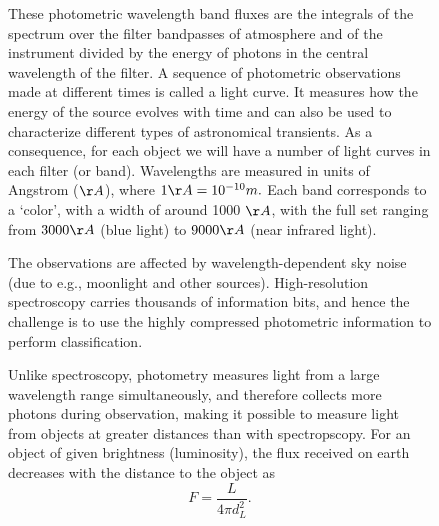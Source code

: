 \documentclass[\docopts]{\docclass}
\begin{document}
\begin{figure}[htbp!]
These photometric wavelength band fluxes are the integrals of the spectrum over the filter bandpasses of atmosphere and of the instrument divided by the energy of photons in the central wavelength of the filter. A sequence of photometric observations made at different times is called a light curve. It measures how the energy of the source evolves with time and can also be used to characterize different types of astronomical transients. As a consequence, for each object we will have a number of light curves in each filter (or band). Wavelengths are measured in units of Angstrom ($\AA$), where $1\AA = 10^{-10} m.$ Each band corresponds to a `color', with a width of around 1000 $\AA$, with the full set ranging from $3000\AA$ (blue light) to $9000\AA$ (near infrared light).

The observations are affected by wavelength-dependent sky noise (due to e.g., moonlight and other sources). 
High-resolution spectroscopy carries thousands of information bits, and hence the challenge is to use the highly compressed photometric information to perform classification.

Unlike spectroscopy, photometry measures light from a large wavelength range simultaneously, and therefore collects more photons during observation, making it possible to measure light from objects at greater distances than with spectropscopy. For an object of given brightness (luminosity), the flux received on earth decreases with the distance to the object as
\begin{equation}
F = \frac{L}{4\pi d_L^2}.
\end{equation}







\end{figure}
\end{document}

